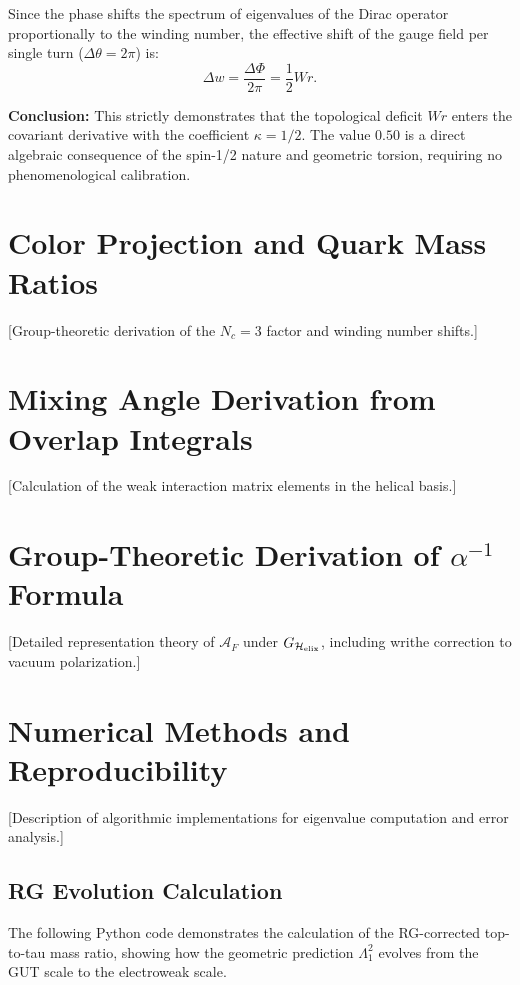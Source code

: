\documentclass[12pt, a4paper]{article}
\theoremstyle{definition}
\newcommand{\cA}{\mathcal{A}}
\newcommand{\Hel}{\mathcal{H}_{\rm elix}}
\begin{document}
Since the phase shifts the spectrum of eigenvalues of the Dirac operator proportionally to the winding number, the effective shift of the gauge field per single turn ($\Delta \theta = 2\pi$) is:
\begin{equation}
\Delta w = \frac{\Delta \Phi}{2\pi} = \frac{1}{2} Wr.
\end{equation}

\textbf{Conclusion:} This strictly demonstrates that the topological deficit $Wr$ enters the covariant derivative with the coefficient $\kappa = 1/2$. The value $0.50$ is a direct algebraic consequence of the spin-1/2 nature and geometric torsion, requiring no phenomenological calibration.

\section{Color Projection and Quark Mass Ratios}
\label{app:color-projection}
[Group-theoretic derivation of the $N_c = 3$ factor and winding number shifts.]

\section{Mixing Angle Derivation from Overlap Integrals}
\label{app:mixing-derivation}
[Calculation of the weak interaction matrix elements in the helical basis.]

\section{Group-Theoretic Derivation of $\alpha^{-1}$ Formula}
\label{app:alpha-derivation}
[Detailed representation theory of $\cA_F$ under $G_{\Hel}$, including writhe correction to vacuum polarization.]

\section{Numerical Methods and Reproducibility}
\label{app:numerics}
[Description of algorithmic implementations for eigenvalue computation and error analysis.]

\subsection{RG Evolution Calculation}
The following Python code demonstrates the calculation of the RG-corrected top-to-tau mass ratio, showing how the geometric prediction $\Lambda_1^2$ evolves from the GUT scale to the electroweak scale.
\end{document}
